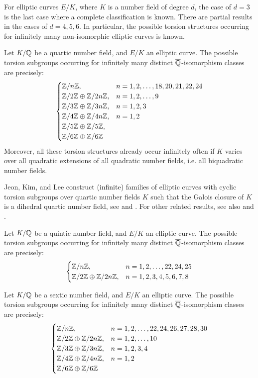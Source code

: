 For elliptic curves $E/K$, where $K$ is a number field of degree $d$, the case of $d= 3$ is the last case where a complete classification is known. There are partial results in the cases of $d= 4, 5, 6$. In particular, the possible torsion structures occurring for infinitely many non-isomorphic elliptic curves is known.


\begin{thm} \label{thm:geninfquartic}
Let $K/\mathbb{Q}$ be a quartic number field, and $E/K$ an elliptic curve. The possible torsion subgroups occurring for infinitely many distinct $\overline{\mathbb{Q}}$-isomorphism classes are precisely:
	\[
	\begin{cases}
	\mathbb{Z}/n\mathbb{Z}, & n= 1, 2, \ldots, 18, 20, 21, 22, 24 \\
	\mathbb{Z}/2\mathbb{Z} \oplus \mathbb{Z}/2n\mathbb{Z}, & n= 1, 2, \ldots, 9 \\
	\mathbb{Z}/3\mathbb{Z} \oplus \mathbb{Z}/3n\mathbb{Z}, & n= 1, 2, 3 \\
	\mathbb{Z}/4\mathbb{Z} \oplus \mathbb{Z}/4n\mathbb{Z}, & n= 1, 2 \\
	\mathbb{Z}/5\mathbb{Z} \oplus \mathbb{Z}/5\mathbb{Z}, \\
	\mathbb{Z}/6\mathbb{Z} \oplus \mathbb{Z}/6\mathbb{Z}
	\end{cases}
	\]
Moreover, all these torsion structures already occur infinitely often if $K$ varies over all quadratic extensions of all quadratic number fields, i.e. all biquadratic number fields. 
\end{thm}


Jeon, Kim, and Lee construct (infinite) families of elliptic curves with cyclic torsion subgroups over quartic number fields $K$ such that the Galois closure of $K$ is a dihedral quartic number field, see \cite{jeonkimlee15} and \cite{jeonkimlee13}. For other related results, see also \cite{jeonkimlee11quartic} and \cite{najman12}.


\begin{thm}
Let $K/\mathbb{Q}$ be a quintic number field, and $E/K$ an elliptic curve. The possible torsion subgroups occurring for infinitely many distinct $\overline{\mathbb{Q}}$-isomorphism classes are precisely:
	\[
	\begin{cases}
	\mathbb{Z}/n\mathbb{Z}, & n= 1, 2, \ldots, 22, 24, 25 \\
	\mathbb{Z}/2\mathbb{Z} \oplus \mathbb{Z}/2n\mathbb{Z}, & n= 1, 2, 3, 4, 5, 6, 7, 8 
	\end{cases}
	\]
\end{thm}


\begin{thm}
Let $K/\mathbb{Q}$ be a sextic number field, and $E/K$ an elliptic curve. The possible torsion subgroups occurring for infinitely many distinct $\overline{\mathbb{Q}}$-isomorphism classes are precisely:
	\[
	\begin{cases}
	\mathbb{Z}/n\mathbb{Z}, & n= 1, 2, \ldots, 22, 24, 26, 27, 28, 30 \\
	\mathbb{Z}/2\mathbb{Z} \oplus \mathbb{Z}/2n\mathbb{Z}, & n= 1, 2, \ldots, 10 \\
	\mathbb{Z}/3\mathbb{Z} \oplus \mathbb{Z}/3n\mathbb{Z}, & n= 1, 2, 3, 4 \\
	\mathbb{Z}/4\mathbb{Z} \oplus \mathbb{Z}/4n\mathbb{Z}, & n= 1, 2 \\ 
	\mathbb{Z}/6\mathbb{Z} \oplus  \mathbb{Z}/6\mathbb{Z}
	\end{cases}
	\]
\end{thm}


